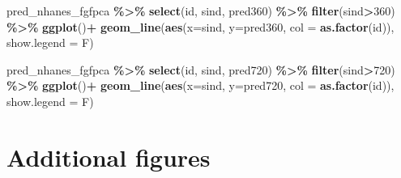 \documentclass[
]{article}
\newenvironment{Shaded}{\begin{snugshade}}{\end{snugshade}}
\newcommand{\AttributeTok}[1]{\textcolor[rgb]{0.13,0.29,0.53}{#1}}
\newcommand{\DecValTok}[1]{\textcolor[rgb]{0.00,0.00,0.81}{#1}}
\newcommand{\FunctionTok}[1]{\textcolor[rgb]{0.13,0.29,0.53}{\textbf{#1}}}
\newcommand{\NormalTok}[1]{#1}
\newcommand{\SpecialCharTok}[1]{\textcolor[rgb]{0.81,0.36,0.00}{\textbf{#1}}}
\begin{document}
\begin{Shaded}
\begin{Highlighting}[]
\NormalTok{pred\_nhanes\_fgfpca }\SpecialCharTok{\%\textgreater{}\%}
  \FunctionTok{select}\NormalTok{(id, sind, pred360) }\SpecialCharTok{\%\textgreater{}\%}
  \FunctionTok{filter}\NormalTok{(sind}\SpecialCharTok{\textgreater{}}\DecValTok{360}\NormalTok{) }\SpecialCharTok{\%\textgreater{}\%}
  \FunctionTok{ggplot}\NormalTok{()}\SpecialCharTok{+}
  \FunctionTok{geom\_line}\NormalTok{(}\FunctionTok{aes}\NormalTok{(}\AttributeTok{x=}\NormalTok{sind, }\AttributeTok{y=}\NormalTok{pred360, }\AttributeTok{col =} \FunctionTok{as.factor}\NormalTok{(id)), }\AttributeTok{show.legend =}\NormalTok{ F)}

\NormalTok{pred\_nhanes\_fgfpca }\SpecialCharTok{\%\textgreater{}\%}
  \FunctionTok{select}\NormalTok{(id, sind, pred720) }\SpecialCharTok{\%\textgreater{}\%}
  \FunctionTok{filter}\NormalTok{(sind}\SpecialCharTok{\textgreater{}}\DecValTok{720}\NormalTok{) }\SpecialCharTok{\%\textgreater{}\%}
  \FunctionTok{ggplot}\NormalTok{()}\SpecialCharTok{+}
  \FunctionTok{geom\_line}\NormalTok{(}\FunctionTok{aes}\NormalTok{(}\AttributeTok{x=}\NormalTok{sind, }\AttributeTok{y=}\NormalTok{pred720, }\AttributeTok{col =} \FunctionTok{as.factor}\NormalTok{(id)), }\AttributeTok{show.legend =}\NormalTok{ F)}
\end{Highlighting}
\end{Shaded}

\hypertarget{additional-figures}{%
\section{Additional figures}\label{additional-figures}}
\end{document}
